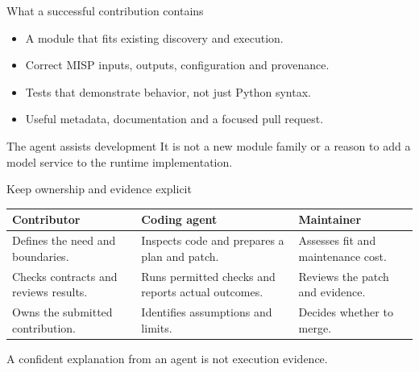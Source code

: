 \begin{frame}[t,plain]
    \titlepage
\end{frame}

\begin{frame}{What a successful contribution contains}
    \begin{itemize}
        \item A module that fits existing discovery and execution.
        \item Correct MISP inputs, outputs, configuration and provenance.
        \item Tests that demonstrate behavior, not just Python syntax.
        \item Useful metadata, documentation and a focused pull request.
    \end{itemize}
    \begin{block}{The agent assists development}
        It is not a new module family or a reason to add a model service
        to the runtime implementation.
    \end{block}
\end{frame}

\begin{frame}{Keep ownership and evidence explicit}
    \small
    \begin{tabular}{@{}P{2.2cm}P{4cm}P{4cm}@{}}
        \toprule
        Contributor & Coding agent & Maintainer \\
        \midrule
        Defines the need and boundaries. &
        Inspects code and prepares a plan and patch. &
        Assesses fit and maintenance cost. \\
        Checks contracts and reviews results. &
        Runs permitted checks and reports actual outcomes. &
        Reviews the patch and evidence. \\
        Owns the submitted contribution. &
        Identifies assumptions and limits. &
        Decides whether to merge. \\
        \bottomrule
    \end{tabular}
    \medskip
    A confident explanation from an agent is not execution evidence.
\end{frame}

